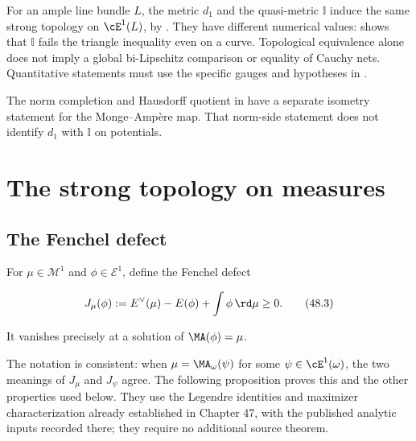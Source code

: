 \begin{remark}
\label{rem:ch48-d1-comparison}
For an ample line bundle $L$, the metric $d_1$ and the quasi-metric
$\mathbb I$ induce the same strong topology on $\cE^1(L)$, by
.
They have different numerical values: 
shows that $\mathbb I$ fails the triangle inequality even on a curve.
Topological equivalence alone does not imply a global bi-Lipschitz
comparison or equality of Cauchy nets. Quantitative statements must use the
specific gauges and hypotheses in \cite{BJKS1}.

The norm completion and Hausdorff quotient in
 have a separate isometry statement
for the Monge--Amp\`ere map. That norm-side statement does not identify
$d_1$ with $\mathbb I$ on potentials.
\end{remark}

\section{The strong topology on measures}
\label{sec:ch48-measures}

\subsection{The Fenchel defect}
\label{sec:ch48-fenchel-defect}

For $\mu\in\mathcal M^1$ and $\phi\in\mathcal E^1$, define the Fenchel
defect

\[
             J_\mu(\phi):=E^\vee(\mu)-E(\phi)+\int\phi\,\rd \mu\geq0.
\tag{48.3}\label{eq:bj-fenchel-defect}
\]

It vanishes precisely at a solution of $\MA(\phi)=\mu$.

The notation is consistent: when $\mu=\MA_\omega(\psi)$ for some
$\psi\in\cE^1(\omega)$, the two meanings of $J_\mu$ and $J_\psi$
agree.  The following proposition proves this and the other properties used
below. They use the Legendre identities and maximizer characterization
already established in Chapter 47, with the published analytic inputs
recorded there; they require no additional source theorem.

